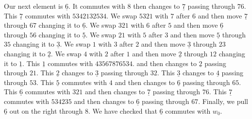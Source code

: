\documentclass[a4paper]{amsart}
\begin{document}
Our next element is  $\underline{6}$. It commutes with $8$
then changes to $\underline{7}$ passing through
$76$. This $\underline{7}$ commutes with $5342132534$.
We swap $5321$ with $7$ after $6$ and then move 
$\underline{7}$ through
$67$ changing it to $\underline{6}$. 
We swap $321$ with $6$ after $5$ and then move 
$\underline{6}$ through
$56$ changing it to $\underline{5}$. 
We swap $21$ with $5$ after $3$ and then move 
$\underline{5}$ through
$35$ changing it to $\underline{3}$. 
We swap $1$ with $3$ after $2$ and then move 
$\underline{3}$ through
$23$ changing it to $\underline{2}$. 
We swap $4$ with $2$ after $1$ and then move 
$\underline{2}$ through
$12$ changing it to $\underline{1}$. 
This $\underline{1}$ commutes with $43567876534$.
and then changes to $\underline{2}$ passing through 
$21$. This $\underline{2}$ changes to $\underline{3}$ 
passing through  $32$.
This $\underline{3}$ changes to $\underline{4}$ 
passing through  $53$.
This $\underline{5}$ commutes with $4$
and then changes to $\underline{6}$ passing through 
$65$. This $\underline{6}$ commutes with $321$
and then changes to $\underline{7}$ passing through 
$76$. This $\underline{7}$ commutes with $534235$
and then changes to $\underline{6}$ passing through 
$67$. Finally, we pull $\underline{6}$ out on the right
through $8$. We have checked that 
$\underline{6}$ commutes with $w_0$.
\end{document}
